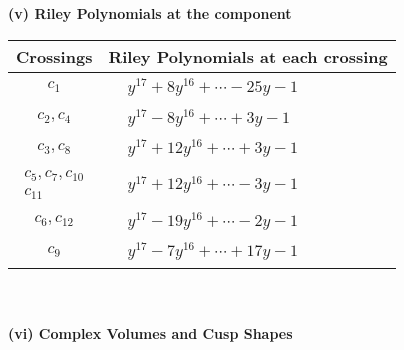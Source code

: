 \documentclass[1p]{elsarticle_modified}
\theoremstyle{definition}
\begin{document}
\newpage\renewcommand{\arraystretch}{1}
\flushleft \textbf{(v) Riley Polynomials at the component}\newline \\
\begin{tabular}{m{50pt}|m{274pt}}
Crossings & \hspace{64pt}Riley Polynomials at each crossing \\
\hline $$\begin{aligned}c_{1}\end{aligned}$$&$\begin{aligned}
&y^{17}+8 y^{16}+\cdots-25 y-1
\end{aligned}$\\
\hline $$\begin{aligned}c_{2},c_{4}\end{aligned}$$&$\begin{aligned}
&y^{17}-8 y^{16}+\cdots+3 y-1
\end{aligned}$\\
\hline $$\begin{aligned}c_{3},c_{8}\end{aligned}$$&$\begin{aligned}
&y^{17}+12 y^{16}+\cdots+3 y-1
\end{aligned}$\\
\hline $$\begin{aligned}c_{5},c_{7},c_{10}\\c_{11}\end{aligned}$$&$\begin{aligned}
&y^{17}+12 y^{16}+\cdots-3 y-1
\end{aligned}$\\
\hline $$\begin{aligned}c_{6},c_{12}\end{aligned}$$&$\begin{aligned}
&y^{17}-19 y^{16}+\cdots-2 y-1
\end{aligned}$\\
\hline $$\begin{aligned}c_{9}\end{aligned}$$&$\begin{aligned}
&y^{17}-7 y^{16}+\cdots+17 y-1
\end{aligned}$\\
\hline
\end{tabular}\\~\\
\newpage\flushleft \textbf{(vi) Complex Volumes and Cusp Shapes}
\end{document}
